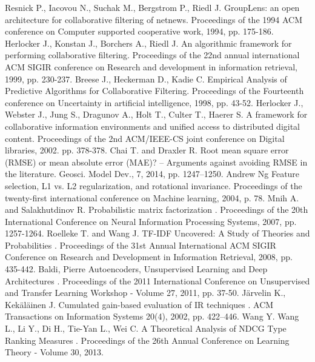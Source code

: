 \documentclass[a4paper,article,14pt]{extarticle}
\begin{document}
\pagebreak

\begin{thebibliography}{1}
 Resnick P., Iacovou N., Suchak M., Bergstrom P., Riedl J. \flqq GroupLens: an open architecture for collaborative filtering of netnews\frqq. Proceedings of the 1994 ACM conference on Computer supported cooperative work, 1994, pp. 175-186.
 Herlocker J., Konstan J., Borchers A., Riedl J. \flqq An algorithmic framework for performing collaborative filtering\frqq. Proceedings of the 22nd annual international ACM SIGIR conference on Research and development in information retrieval, 1999, pp. 230-237.
 Breese J., Heckerman D., Kadie C. \flqq Empirical Analysis of Predictive Algorithms for Collaborative Filtering\frqq.  Proceedings of the Fourteenth conference on Uncertainty in artificial intelligence, 1998, pp. 43-52.
 Herlocker J., Webster J., Jung S., Dragunov A., Holt T., Culter T., Haerer S. \flqq A framework for collaborative information environments and unified access to distributed digital content\frqq. Proceedings of the 2nd ACM/IEEE-CS joint conference on Digital libraries, 2002. pp. 378-378.
 Chai T. and Draxler R. \flqq Root mean square error (RMSE) or mean absolute error (MAE)? – Arguments against avoiding RMSE in the literature\frqq. Geosci. Model Dev., 7, 2014, pp. 1247–1250.
 Andrew Ng \flqq Feature selection, L1 vs. L2 regularization, and rotational invariance\frqq. Proceedings of the twenty-first international conference on Machine learning, 2004, p. 78.
 Mnih A. and Salakhutdinov R. \flqq Probabilistic matrix factorization \frqq. Proceedings of the 20th International Conference on Neural Information Processing Systems, 2007, pp. 1257-1264.
 Roelleke T. and Wang J. \flqq TF-IDF Uncovered: A Study of Theories and Probabilities \frqq. Proceedings of the 31st Annual International ACM SIGIR Conference on Research and Development in Information Retrieval, 2008, pp. 435-442.
 Baldi, Pierre \flqq Autoencoders, Unsupervised Learning and Deep Architectures \frqq. Proceedings of the 2011 International Conference on Unsupervised and Transfer Learning Workshop - Volume 27, 2011, pp. 37-50.
 Järvelin K., Kekäläinen J. \flqq Cumulated gain-based evaluation of IR techniques \frqq. ACM Transactions on Information Systems 20(4), 2002, pp. 422–446.
 Wang Y. Wang L., Li Y., Di H., Tie-Yan L., Wei C. \flqq A Theoretical Analysis of NDCG Type Ranking Measures \frqq. Proceedings of the 26th Annual Conference on Learning Theory - Volume 30, 2013.

\end{thebibliography}
\end{document}
